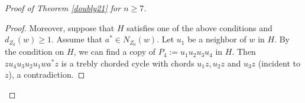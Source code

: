 \documentclass[12pt]{article}
\begin{document}
\begin{proof}[Proof of Theorem \ref{doubly21} for $n\ge 7$]
\begin{proof}
Moreover,
suppose that $H$ satisfies one of the above conditions and  $d_{Z_0}(w)\ge 1$.
Assume that $a^*\in N_{Z_0}(w)$. Let $u_1$ be a neighbor of $w$ in $H$. By the condition on $H$, 
we can find a copy of $P_4:=u_1u_2u_3u_4$ in $H$. 
Then $zu_4u_3u_2u_1wa^*z$ is a trebly chorded cycle with  chords $u_1z, u_2z$ and $u_3z$ (incident to $z$), a contradiction.
%
%
%
%
%
%
%
\end{proof}






\end{proof}
\end{document}
